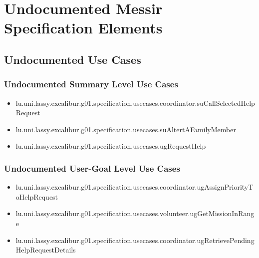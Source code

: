 	
\chapter{Undocumented Messir Specification Elements}


\section[Undocumented Use Cases]{Undocumented Use Cases}

\subsection[Undocumented Use Cases - Summary Level]{Undocumented Summary Level Use Cases}
\begin{itemize}
\item lu.uni.lassy.excalibur.g01.specification.usecases.coordinator.suCallSelectedHelpRequest 
\item lu.uni.lassy.excalibur.g01.specification.usecases.suAltertAFamilyMember 
\item lu.uni.lassy.excalibur.g01.specification.usecases.ugRequestHelp 
\end{itemize}

\subsection[Undocumented Use Cases - User-Goal Level]{Undocumented User-Goal Level Use Cases}
\begin{itemize}
\item lu.uni.lassy.excalibur.g01.specification.usecases.coordinator.ugAssignPriorityToHelpRequest 
\item lu.uni.lassy.excalibur.g01.specification.usecases.volunteer.ugGetMissionInRange 
\item lu.uni.lassy.excalibur.g01.specification.usecases.coordinator.ugRetrievePendingHelpRequestDetails 
\end{itemize}

